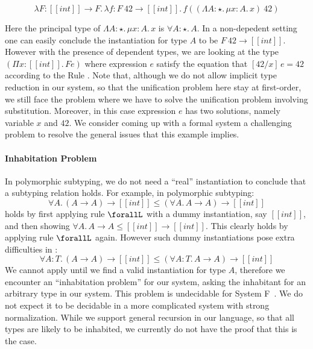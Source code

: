 \begin{equation*}
    \lambda F : [[int]] \rightarrow F.\, \lambda f : F~42 \rightarrow [[int]].\, f ((\Lambda A : \star.\,\mu x : A.\, x)~42)
\end{equation*}

Here the principal type of $\Lambda A : \star.\,\mu x : A.\, x$ is $\forall A : \star.\, A$.
In a non-depedent setting one can easily conclude the instantiation for type $A$ to be
$F~42 \rightarrow [[int]]$. However with the presence of dependent types,
we are looking at the type $(\Pi x : [[int]].\, F e)$ where expression $e$
satisfy the equation that $[42/x]\,e = 42$ according to the Rule .
Note that, although we do not allow implicit type reduction in our system,
so that the unification problem here stay at first-order, we still face the
problem where we have to solve
the unification problem involving substitution. Moreover, in this case expression
$e$ has two solutions, namely variable $x$ and $42$. We consider coming up with
a formal system a challenging problem to resolve the general issues that this
example implies.

\paragraph{Inhabitation Problem}

In polymorphic subtyping, we do not need a ``real'' instantiation to conclude
that a subtyping relation holds. For example, in polymorphic subtyping:
\begin{equation*}
    \forall A.\, (A \rightarrow A) \rightarrow [[int]] \le (\forall A.\, A \rightarrow A) \rightarrow [[int]]
\end{equation*}
\noindent holds by first applying rule $\forallL$ with a dummy instantiation,
say $[[int]]$, and then showing $\forall A.\, A \rightarrow A \le [[int]] \rightarrow [[int]]$.
This clearly holds by applying rule $\forallL$ again. However such dummy instantiations
pose extra difficulties in \name:
\begin{equation*}
    \forall A : T.\, (A \rightarrow A) \rightarrow [[int]] \le (\forall A : T.\, A \rightarrow A) \rightarrow [[int]]
\end{equation*}
We cannot apply  until we find a valid instantiation for type $A$,
therefore we encounter an ``inhabitation problem'' for our system, asking the
inhabitant for an arbitrary type in our system. This problem is
undecidable for System F~\cite{dudenhefner2019simpler}. We do not expect it to be
decidable in a more complicated system with strong normalization.
While we support general recursion in our language, so that all types are
likely to be inhabited, we currently do not have the proof that this is the case.
